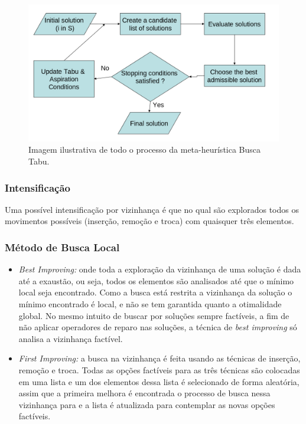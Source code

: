 \documentclass[conference]{IEEEtran}
\begin{document}
    \begin{figure}[!htb]
  \centering
 
  \includegraphics[scale=0.25]{imagens/busca-tabu.png}
 \caption{Imagem ilustrativa de todo o processo da meta-heurística Busca Tabu. \cite{fraser2013whole}}
  \label{figura_tabu}
\end{figure}

    \subsubsection{Intensificação}

        Uma possível intensificação por vizinhança é que no qual são explorados todos os movimentos possíveis (inserção, remoção e troca) com quaisquer três elementos. 

    \subsubsection{Método de Busca Local}

        \begin{itemize}

        \item {\it Best Improving:} onde toda a exploração da vizinhança de uma solução é dada até a exaustão, ou seja, todos os elementos são analisados até que o mínimo local seja encontrado. Como
            a busca está restrita a vizinhança da solução o mínimo encontrado é local, e não se tem garantida quanto a otimalidade global. No mesmo intuito de buscar por soluções sempre factíveis, a
                fim de não aplicar operadores de reparo nas soluções, a técnica de {\it best improving} só analisa a vizinhança factível. 

        \item {\it First Improving:} a busca na vizinhança é feita usando as técnicas de inserção, remoção e troca. Todas as opções factíveis para as três técnicas são colocadas em uma lista
        e um dos elementos dessa lista é selecionado de forma aleatória, assim que a primeira melhora é encontrada o processo de busca nessa vizinhança para e a lista é atualizada para
        contemplar as novas opções factíveis. 
        \end{itemize}
\end{document}
